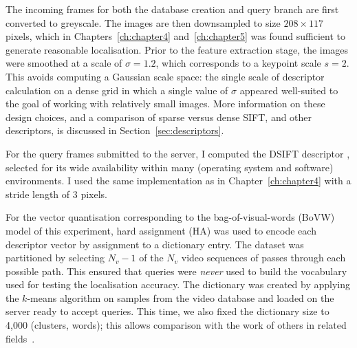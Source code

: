 The incoming frames for both the database creation and query branch are first converted to greyscale. The images are then downsampled to size $208 \times 117$ pixels, which in Chapters~\ref{ch:chapter4} and~\ref{ch:chapter5} was found sufficient to generate reasonable localisation. Prior to the feature extraction stage, the images were smoothed at a scale of $\sigma = 1.2$, which corresponds to a keypoint scale $s = 2$. This avoids computing a Gaussian scale space: the single scale of descriptor calculation on a dense grid in which a single value of $\sigma$ appeared well-suited to the goal of working with relatively small images. More information on these design choices, and a comparison of sparse versus dense SIFT, and other descriptors, is discussed in Section~\ref{sec:descriptors}.





For the query frames submitted to the server, I computed the DSIFT descriptor \citep{Lowe1999,Lazebnik2006}, selected for its wide availability within many (operating system and software) environments.  I used the same implementation as in Chapter~\ref{ch:chapter4} with a stride length of 3 pixels. %

For the vector quantisation corresponding to the bag-of-visual-words (BoVW) model of this experiment, hard assignment (HA) was used to encode each descriptor vector by assignment to a dictionary entry. The dataset was partitioned by selecting $N_v-1$ of the $N_v$ video sequences of passes through each possible path. This ensured that queries were {\em never} used to build the vocabulary used for testing the localisation accuracy. The dictionary was created by applying the $k$-means algorithm on samples from the video database and loaded on the server ready to accept queries. This time, we also fixed the dictionary size to 4,000 (clusters, words); this allows comparison with the work of others in related fields~\cite{Chatfield2011}.

